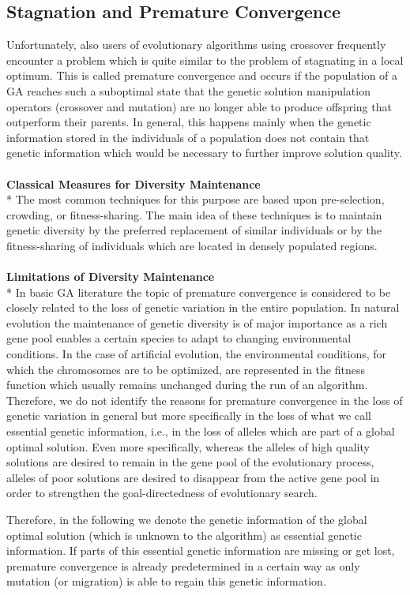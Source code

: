 \documentclass[12pt]{article}
\newcommand{\mysubparagraph}[1]{\textbf{#1}\mbox{}\\*}
\begin{document}
\subsection{Stagnation and Premature Convergence}
Unfortunately, also users of evolutionary algorithms using crossover frequently encounter a problem which is quite similar to the problem of stagnating in a local optimum. This is called premature convergence and occurs if the population of a GA reaches such a suboptimal state that the genetic solution manipulation operators (crossover and mutation) are no longer able to produce offspring that outperform their parents. In general, this happens mainly when the genetic information stored in the individuals of a population does not contain that genetic information which would be necessary to further improve solution quality.\\\\
\mysubparagraph{Classical Measures for Diversity Maintenance}
The most common techniques for this purpose are based upon pre-selection, crowding, or fitness-sharing. The main idea of these techniques is to maintain genetic diversity by the preferred replacement of similar individuals or by the fitness-sharing of individuals which are located in densely populated regions.\\\\
\mysubparagraph{Limitations of Diversity Maintenance}
In basic GA literature the topic of premature convergence is considered to be closely related to the loss of genetic variation in the entire population. In natural evolution the maintenance of genetic diversity is of major importance as a rich gene pool enables a certain species to adapt to changing environmental conditions. In the case of artificial evolution, the environmental conditions, for which the chromosomes are to be optimized, are represented in the fitness function which usually remains unchanged during the run of an algorithm. Therefore, we do not identify the reasons for premature convergence in the loss of genetic variation in general but more specifically in the loss of what we call essential genetic information, i.e., in the loss of alleles which are part of a global optimal solution. Even more specifically, whereas the alleles of high quality solutions are desired to remain in the gene pool of the evolutionary process, alleles of poor solutions are desired to disappear from the active gene pool in order to strengthen the goal-directedness of evolutionary search.

Therefore, in the following we denote the genetic information of the global optimal solution (which is unknown to the algorithm) as essential genetic information. If parts of this essential genetic information are missing or get lost, premature convergence is already predetermined in a certain way as only mutation (or migration) is able to regain this genetic information.
\end{document}
